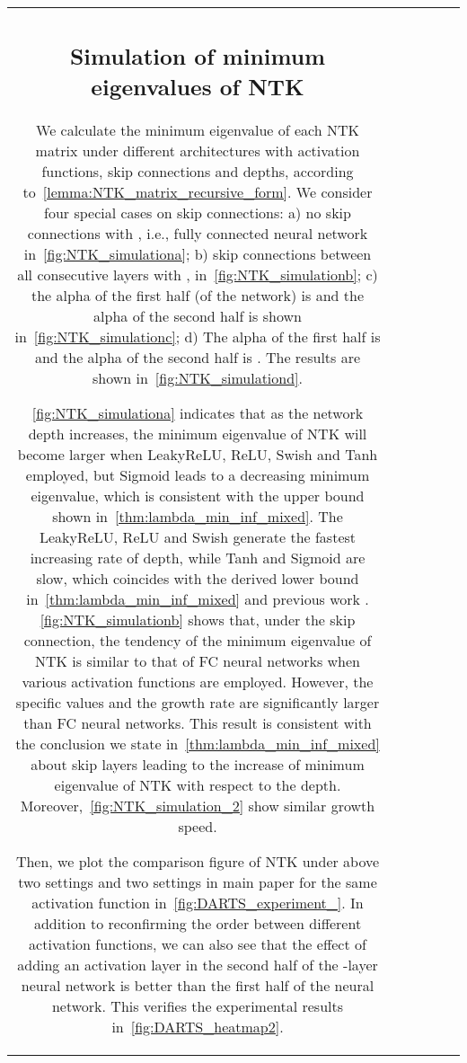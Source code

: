 \documentclass[nohyperref]{article}
\theoremstyle{plain}
\theoremstyle{definition}
\theoremstyle{remark}
\begin{document}
\begin{table*}[t]
\begin{threeparttable}
{\begin{tabular}{c|c|c|c|c|c}
\subsection{Simulation of minimum eigenvalues of NTK}
\label{ssec:Simulation_of_NTK}

We calculate the minimum eigenvalue of each NTK matrix under different architectures with activation functions, skip connections and depths, according to~\cref{lemma:NTK_matrix_recursive_form}. 
We consider four special cases on skip connections: a) no skip connections with , i.e., fully connected neural network in~\cref{fig:NTK_simulationa}; b) skip connections between all consecutive layers with ,  in~\cref{fig:NTK_simulationb}; c) the alpha of the first half (of the network) is  and the alpha of the second half is  shown in~\cref{fig:NTK_simulationc}; d) The alpha of the first half is  and the alpha of the second half is . The results are shown in~\cref{fig:NTK_simulationd}.

\cref{fig:NTK_simulationa} indicates that as the network depth increases, the minimum eigenvalue of NTK will become larger when LeakyReLU, ReLU, Swish and Tanh employed, but Sigmoid leads to a decreasing minimum eigenvalue, which is consistent with the upper bound shown in~\cref{thm:lambda_min_inf_mixed}. 
The LeakyReLU, ReLU and Swish generate the fastest increasing rate of depth, while Tanh and Sigmoid are slow, which coincides with the derived lower bound in~\cref{thm:lambda_min_inf_mixed} and previous work \cite{bachspaper}. \cref{fig:NTK_simulationb} shows that, under the skip connection, the tendency of the minimum eigenvalue of NTK is similar to that of FC neural networks when various activation functions are employed. However, the specific values and the growth rate are significantly larger than FC neural networks.
This result is consistent with the conclusion we state in~\cref{thm:lambda_min_inf_mixed} about skip layers leading to the increase of minimum eigenvalue of NTK with respect to the depth. Moreover,~\cref{fig:NTK_simulation_2} show similar growth speed.

Then, we plot the comparison figure of NTK under above two settings and two settings in main paper for the same activation function in~\cref{fig:DARTS_experiment_}. In addition to reconfirming the order between different activation functions, we can also see that the effect of adding an activation layer in the second half of the -layer neural network is better than the first half of the neural network. This verifies the experimental results in~\cref{fig:DARTS_heatmap2}.



\end{tabular}}
\end{threeparttable}
\end{table*}
\end{document}
